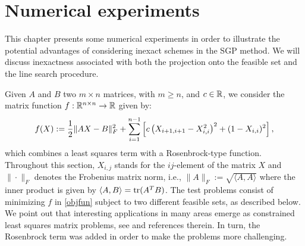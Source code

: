 \chapter{Numerical experiments} \label{chap:NumExp}
\thispagestyle{empty}

This chapter presents some numerical experiments in order to illustrate the potential advantages of considering inexact schemes in the SGP method.
We will discuss inexactness associated with both the projection onto the feasible set and the line search procedure.

Given $A$ and $B$ two $m\times n$ matrices, with $m\geq n$, and $c\in\mathbb{R}$, we consider the matrix function $f:\mathbb{R}^{n\times n}\to\mathbb{R}$ given by:
\begin{equation}\label{objfun}
	f(X):=\displaystyle\frac{1}{2}\|AX-B\|^2_F + \sum_{i=1}^{n-1} \left[ c \left( X_{i+1,i+1}-X_{i,i}^2 \right)^2 + (1-X_{i,i})^2   \right],
\end{equation}
which combines a least squares term with a Rosenbrock-type function.
Throughout this section, $X_{i,j}$ stands for the $ij$-element of the matrix $X$ and $\|\cdot\|_F$ denotes the Frobenius matrix norm, i.e., $\|A\|_F:=\sqrt{\langle A,A \rangle}$ where the inner product is given by $\langle A,B \rangle = \textrm{tr}(A^TB)$.
The test problems consist of minimizing $f$ in \eqref{objfun} subject to two different feasible sets, as described below.
We point out that interesting applications in many areas emerge as constrained least squares matrix problems, see \cite{BirginMartinezRaydan2003} and references therein.
In turn, the Rosenbrock term was added in order to make the problems more challenging.

